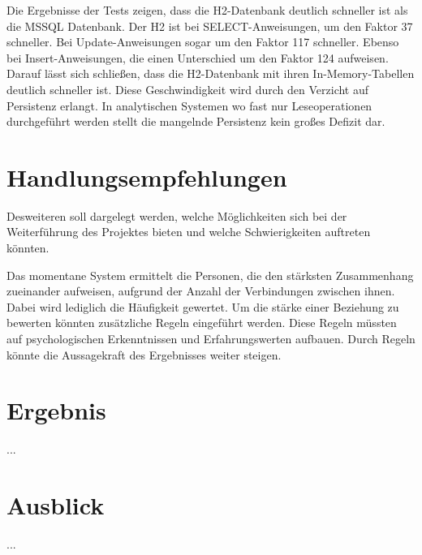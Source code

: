 Die Ergebnisse der Tests zeigen, dass die H2-Datenbank deutlich schneller ist als die MSSQL Datenbank. Der H2 ist bei SELECT-Anweisungen, um den Faktor 37 schneller. Bei Update-Anweisungen sogar um den Faktor 117 schneller. Ebenso bei Insert-Anweisungen, die einen Unterschied um den Faktor 124 aufweisen. Darauf lässt sich schließen, dass die H2-Datenbank mit ihren In-Memory-Tabellen deutlich schneller ist. Diese Geschwindigkeit wird durch den Verzicht auf Persistenz erlangt. In analytischen Systemen wo fast nur Leseoperationen durchgeführt werden stellt die mangelnde Persistenz kein großes Defizit dar. 

\section{Handlungsempfehlungen}

Desweiteren soll dargelegt werden, welche Möglichkeiten sich bei der Weiterführung des Projektes bieten und welche Schwierigkeiten auftreten könnten. 

Das momentane System ermittelt die Personen, die den stärksten Zusammenhang zueinander aufweisen, aufgrund der Anzahl der Verbindungen zwischen ihnen. Dabei wird lediglich die Häufigkeit gewertet. Um die stärke einer Beziehung zu bewerten könnten zusätzliche Regeln eingeführt werden. Diese Regeln müssten auf psychologischen Erkenntnissen und Erfahrungswerten aufbauen. Durch Regeln könnte die Aussagekraft des Ergebnisses weiter steigen. 

\section{Ergebnis}

...

\section{Ausblick}

...
